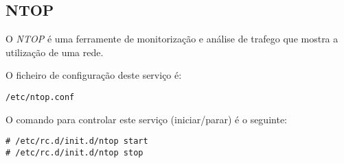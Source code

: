 \subsection{NTOP}

O \emph{NTOP} é uma ferramente de monitorização e análise de trafego que mostra a utilização de uma rede.

O ficheiro de configuração deste serviço é:

\begin{Verbatim}[commandchars=\\\{\}]
/etc/ntop.conf
\end{Verbatim}

O comando para controlar este serviço (iniciar/parar) é o seguinte:

\begin{Verbatim}[commandchars=\\\{\}]
# /etc/rc.d/init.d/ntop start
# /etc/rc.d/init.d/ntop stop
\end{Verbatim}

